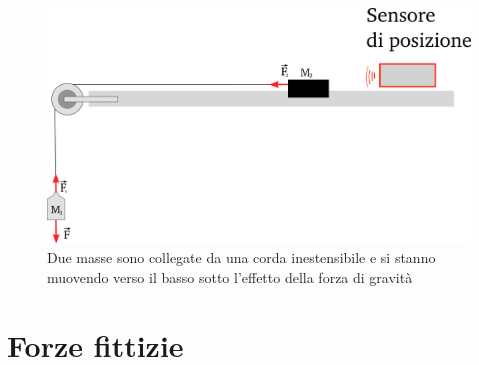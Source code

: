 \documentclass[a4paper,10pt,oneside]{article}
\begin{document}
\begin{figure}[H]
 \centering
 \includegraphics[width=\textwidth]{../immagini/masse_filo_dinamico.png}
 \caption{Due masse sono collegate da una corda inestensibile e si stanno muovendo verso il basso sotto l'effetto della forza di gravità}
 \label{fig:filo_dinamico}
\end{figure}





\section*{Forze fittizie}
\end{document}
